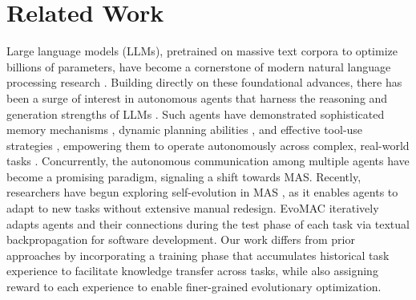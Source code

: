 \documentclass[preprint]{article}
\begin{document}
\section{Related Work}
Large language models (LLMs), pretrained on massive text corpora to optimize billions of parameters, have become a cornerstone of modern natural language processing research \citep{Brown2024Large, bubeck2023sparks, vaswani2017attention, radford2019language, touvron2023llama, wei2022emergent, Shanahan2023, chen2021evaluating, brants2007large, ouyang2022training, yang2023large, qin2023large, kaplan2020scaling}. Building directly on these foundational advances, there has been a surge of interest in autonomous agents that harness the reasoning and generation strengths of LLMs \citep{zhou2023webarena, wang2023recagent, park2023generative, Wang2023Plan, AutoGPT, Wang2024Learning, shinn2024reflexion}. Such agents have demonstrated sophisticated memory mechanisms \citep{park2023generative, sumers2023cognitive}, dynamic planning abilities \citep{Liu2023Dynamic}, and effective tool-use strategies \citep{schick2023toolformer, cai2023large, qin2023toolllm, Ruan2024Observational, yang2023large}, empowering them to operate autonomously across complex, real-world tasks \citep{zhao2024expel, ma2023laser, zhang2023generative, Wang2023Augmenting, ding2023designgpt, weng2023llm}.
Concurrently, the autonomous communication among multiple agents have become a promising paradigm, signaling a shift towards MAS\citet{chen2023agentverse, Chen2024Internet, Cohen2023LM, Guo2024Embodied, li2023camel, wu2023autogen}.
Recently, researchers have begun exploring self-evolution in MAS \citet{hu2025selfevolving, zhang2025evoflow, yuan2024evoagent, shang2024agentsquare, liu2024dynamic, hu2024automated, feng2025heterogeneous}, as it enables agents to adapt to new tasks without extensive manual redesign.
EvoMAC \citep{hu2025selfevolving} iteratively
adapts agents and their connections during the test phase of each task via textual backpropagation for software development.
Our work differs from prior approaches by incorporating a training phase that accumulates historical task experience to facilitate knowledge transfer across tasks, while also assigning reward to each experience to enable finer-grained evolutionary optimization.
\end{document}
